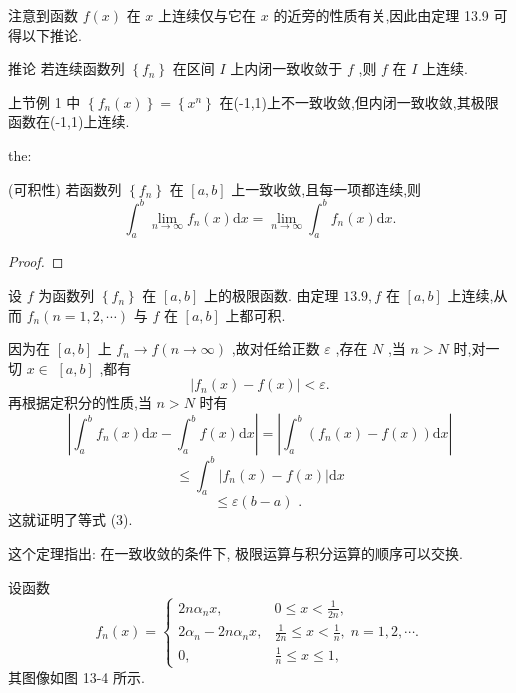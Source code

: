 注意到函数 \(f\left( x\right)\) 在 \(x\) 上连续仅与它在 \(x\) 的近旁的性质有关,因此由定理 13.9 可得以下推论.

推论 若连续函数列 \(\left\{  {f}_{n}\right\}\) 在区间 \(I\) 上内闭一致收敛于 \(f\) ,则 \(f\) 在 \(I\) 上连续.

上节例 1 中 \(\left\{  {{f}_{n}\left( x\right) }\right\}   = \left\{  {x}^{n}\right\}\) 在(-1,1)上不一致收敛,但内闭一致收敛,其极限函数在(-1,1)上连续.

\begin{theorem}{}{the:}

\end{theorem}
 (可积性) 若函数列 \(\left\{  {f}_{n}\right\}\) 在 \(\left\lbrack  {a,b}\right\rbrack\) 上一致收敛,且每一项都连续,则
\[
{\int }_{a}^{b}\mathop{\lim }\limits_{{n \rightarrow  \infty }}{f}_{n}\left( x\right) \mathrm{d}x = \mathop{\lim }\limits_{{n \rightarrow  \infty }}{\int }_{a}^{b}{f}_{n}\left( x\right) \mathrm{d}x. \tag{3}
\]
\begin{proof}

\end{proof}
设 \(f\) 为函数列 \(\left\{  {f}_{n}\right\}\) 在 \(\left\lbrack  {a,b}\right\rbrack\) 上的极限函数. 由定理 \({13.9},f\) 在 \(\left\lbrack  {a,b}\right\rbrack\) 上连续,从而 \({f}_{n}\left( {n = 1,2,\cdots }\right)\) 与 \(f\) 在 \(\left\lbrack  {a,b}\right\rbrack\) 上都可积.

因为在 \(\left\lbrack  {a,b}\right\rbrack\) 上 \({f}_{n} \rightarrow  f\left( {n \rightarrow  \infty }\right)\) ,故对任给正数 \(\varepsilon\) ,存在 \(N\) ,当 \(n > N\) 时,对一切 \(x \in\)  \(\left\lbrack  {a,b}\right\rbrack\) ,都有
\[
\left| {{f}_{n}\left( x\right)  - f\left( x\right) }\right|  < \varepsilon .
\]
再根据定积分的性质,当 \(n > N\) 时有
\[
\left| {{\int }_{a}^{b}{f}_{n}\left( x\right) \mathrm{d}x - {\int }_{a}^{b}f\left( x\right) \mathrm{d}x}\right|  = \left| {{\int }_{a}^{b}\left( {{f}_{n}\left( x\right)  - f\left( x\right) }\right) \mathrm{d}x}\right|
\]
\[
\leq  {\int }_{a}^{b}\left| {{f}_{n}\left( x\right)  - f\left( x\right) }\right| \mathrm{d}x
\]
\[
\leq  \varepsilon \left( {b - a}\right) \text{ . }
\]
这就证明了等式 (3).

这个定理指出: 在一致收敛的条件下, 极限运算与积分运算的顺序可以交换.

\begin{example}

\end{example}
设函数
\[
{f}_{n}\left( x\right)  = \left\{  \begin{array}{ll} {2n}{\alpha }_{n}x, & 0 \leq  x < \frac{1}{2n}, \\  2{\alpha }_{n} - {2n}{\alpha }_{n}x, & \frac{1}{2n} \leq  x < \frac{1}{n},\;n = 1,2,\cdots . \\  0, & \frac{1}{n} \leq  x \leq  1, \end{array}\right.
\]
其图像如图 13-4 所示.

